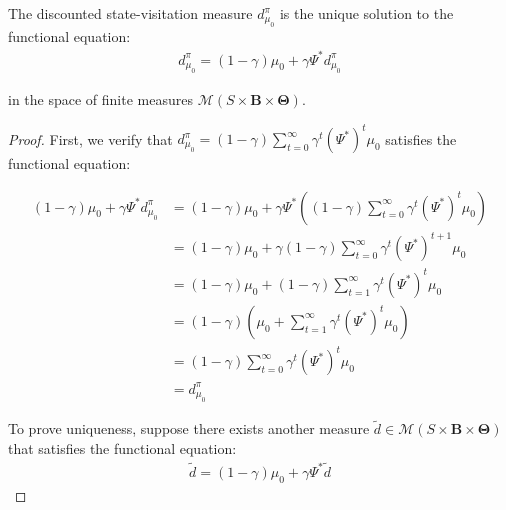 \begin{lemma}
    The discounted state-visitation measure $d^{\pi}_{\mu_0}$ is the unique solution
    to the functional equation:
    \begin{align}
        d^{\pi}_{\mu_0}= (1-\gamma)\mu_{0} + \gamma \Psi^{*} d^{\pi}_{\mu_0}
    \end{align}

    in the space of finite measures $\mathcal{M}(S \times \boldsymbol{B}\times \boldsymbol
        {\Theta})$.
\end{lemma}
\begin{proof}
    First, we verify that
    $d^{\pi}_{\mu_0}= (1-\gamma) \sum_{t=0}^{\infty}\gamma^{t} (\Psi^{*})^{t} \mu_{0}$
    satisfies the functional equation:

    \begin{align}
        (1-\gamma)\mu_{0} + \gamma \Psi^{*} d^{\pi}_{\mu_0} & = (1-\gamma)\mu_{0} + \gamma \Psi^{*} \left( (1-\gamma) \sum_{t=0}^{\infty}\gamma^{t} (\Psi^{*})^{t} \mu_{0} \right) \\
                                                            & = (1-\gamma)\mu_{0} + \gamma (1-\gamma) \sum_{t=0}^{\infty}\gamma^{t} (\Psi^{*})^{t+1}\mu_{0}                        \\
                                                            & = (1-\gamma)\mu_{0} + (1-\gamma) \sum_{t=1}^{\infty}\gamma^{t} (\Psi^{*})^{t} \mu_{0}                                \\
                                                            & = (1-\gamma) \left( \mu_{0} + \sum_{t=1}^{\infty}\gamma^{t} (\Psi^{*})^{t} \mu_{0} \right)                           \\
                                                            & = (1-\gamma) \sum_{t=0}^{\infty}\gamma^{t} (\Psi^{*})^{t} \mu_{0}                                                    \\
                                                            & = d^{\pi}_{\mu_0}
    \end{align}

    To prove uniqueness, suppose there exists another measure
    $\tilde{d}\in \mathcal{M}(S \times \boldsymbol{B}\times \boldsymbol{\Theta})$
    that satisfies the functional equation:
    \begin{align}
        \tilde{d}= (1-\gamma)\mu_{0} + \gamma \Psi^{*} \tilde{d}
    \end{align}


\end{proof}
